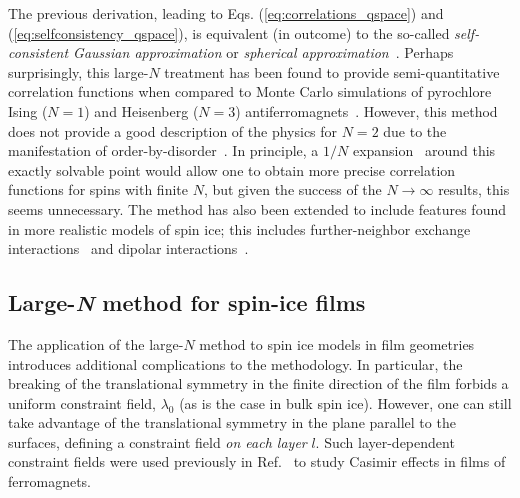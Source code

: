 \documentclass[aps,prx,reprint,runinaddress,superscriptaddress,amsmath,amssymb,floatfix,longbibliography]{revtex4-1}
\newcommand{\lambdabulk}{\lambda_0}
\begin{document}
The previous derivation, leading to Eqs. (\ref{eq:correlations_qspace}) and (\ref{eq:selfconsistency_qspace}), is equivalent (in outcome) to the so-called \emph{self-consistent Gaussian approximation} or \emph{spherical approximation}~\cite{Stanley1968}. Perhaps surprisingly, this large-$N$ treatment has been found to provide semi-quantitative correlation functions when compared to Monte Carlo simulations of pyrochlore Ising ($N=1$) and Heisenberg ($N=3$) antiferromagnets~\cite{Isakov2004}. However, this method does not provide a good description of the physics for $N=2$ due to the manifestation of order-by-disorder~\cite{bramwell1994order,Moessner1998,Moessner1998a}. In principle, a $1/N$ expansion~\cite{Isakov2004} around this exactly solvable point would allow one to obtain more precise correlation functions for spins with finite $N$, but given the success of the $N \rightarrow \infty$ results, this seems unnecessary. The method has also been extended to include features found in more realistic models of spin ice; this includes further-neighbor exchange interactions~\cite{Conlon2010,Silverstein2014} and dipolar interactions~\cite{Sen2013}.

\subsection{Large-\emph{N} method for spin-ice films}
\label{sec:methods:films}

The application of the large-$N$ method to spin ice models in film geometries introduces additional complications to the methodology. In particular, the breaking of the translational symmetry in the finite direction of the film forbids a uniform constraint field, $\lambdabulk$ (as is the case in bulk spin ice). However, one can still take advantage of the translational symmetry in the plane parallel to the surfaces,  defining a constraint field \emph{on each layer} $l$. Such layer-dependent constraint fields were used previously in Ref.~\cite{Dantchev2014} to study Casimir effects in films of ferromagnets.
\end{document}
